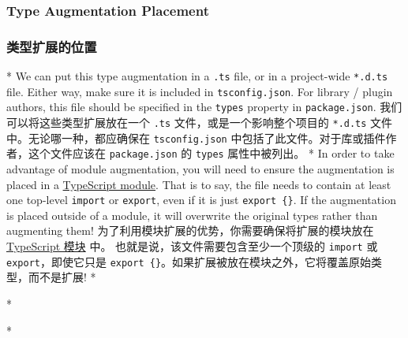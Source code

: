 \begin{paracol}{2}
\subsubsection{Type Augmentation Placement}
\switchcolumn
\subsubsection{类型扩展的位置}
\switchcolumn[0]*%
We can put this type augmentation in a \texttt{.ts} file, or in a
project-wide \texttt{*.d.ts} file. Either way, make sure it is included
in \texttt{tsconfig.json}. For library / plugin authors, this file
should be specified in the \texttt{types} property in
\texttt{package.json}.
\switchcolumn
我们可以将这些类型扩展放在一个 \texttt{.ts} 文件，或是一个影响整个项目的
\texttt{*.d.ts} 文件中。无论哪一种，都应确保在 \texttt{tsconfig.json}
中包括了此文件。对于库或插件作者，这个文件应该在 \texttt{package.json}
的 \texttt{types} 属性中被列出。
\switchcolumn[0]*%
In order to take advantage of module augmentation, you will need to
ensure the augmentation is placed in a
\href{https://www.typescriptlang.org/docs/handbook/modules.html}{TypeScript
module}. That is to say, the file needs to contain at least one
top-level \texttt{import} or \texttt{export}, even if it is just
\texttt{export\ \{\}}. If the augmentation is placed outside of a
module, it will overwrite the original types rather than augmenting
them!
\switchcolumn
为了利用模块扩展的优势，你需要确保将扩展的模块放在
\href{https://www.typescriptlang.org/docs/handbook/modules.html}{TypeScript
模块} 中。 也就是说，该文件需要包含至少一个顶级的 \texttt{import} 或
\texttt{export}，即使它只是
\texttt{export\ \{\}}。如果扩展被放在模块之外，它将覆盖原始类型，而不是扩展!
\switchcolumn[0]*%
\switchcolumn
{}
\switchcolumn[0]*%
\switchcolumn
{}
\switchcolumn[0]*%

\end{paracol}

